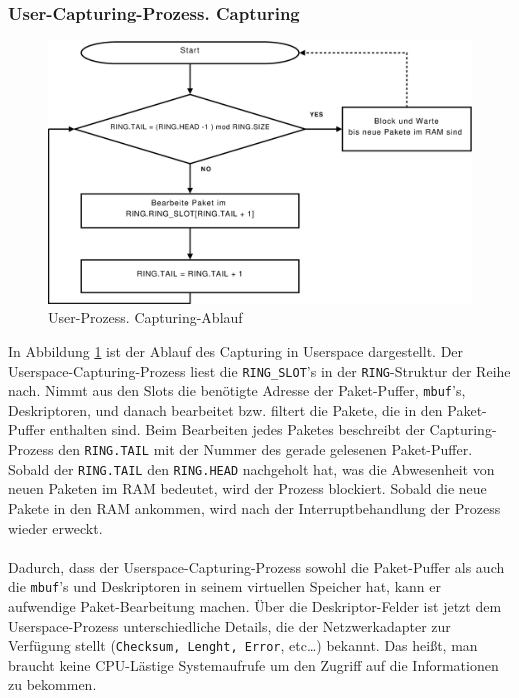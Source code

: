 \subsubsection*{User-Capturing-Prozess. Capturing}
\begin{figure}
\centering 
\includegraphics[width=6.0in]{bilder/FlowChart_US_CAP}
\caption{User-Prozess. Capturing-Ablauf}
\label{img:us_capt}
\end{figure}
In Abbildung \ref{img:us_capt} ist der Ablauf des Capturing
in Userspace dargestellt. Der Userspace-Capturing-Prozess liest die \verb+RING_SLOT+'s in der \verb+RING+-Struktur 
der Reihe nach. Nimmt aus den Slots die benötigte Adresse der Paket-Puffer, \verb+mbuf+'s, 
Deskriptoren, und danach bearbeitet bzw. filtert die Pakete, die in den Paket-Puffer
enthalten sind. Beim Bearbeiten jedes Paketes beschreibt der Capturing-Prozess
den \verb+RING.TAIL+ mit der Nummer des gerade gelesenen Paket-Puffer. Sobald 
der \verb+RING.TAIL+ den \verb+RING.HEAD+ nachgeholt hat, was die Abwesenheit 
von neuen Paketen im RAM bedeutet, wird der Prozess blockiert. Sobald die 
neue Pakete in den RAM ankommen, wird nach der Interruptbehandlung der Prozess 
wieder erweckt. \\\\
%
Dadurch, dass der Userspace-Capturing-Prozess sowohl die Paket-Puffer als auch
die \verb+mbuf+'s und Deskriptoren in seinem virtuellen Speicher hat, kann er
aufwendige Paket-Bearbeitung machen. Über die Deskriptor-Felder ist jetzt dem
Userspace-Prozess unterschiedliche Details, die der Netzwerkadapter zur Verfügung
stellt (\verb+Checksum, Lenght, Error+, etc\ldots ) bekannt. Das heißt, man braucht 
keine CPU-Lästige Systemaufrufe um den Zugriff auf die Informationen zu bekommen.

